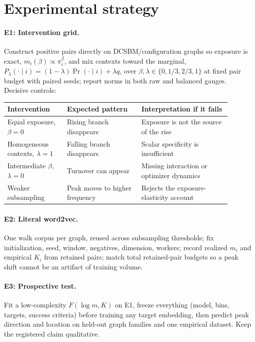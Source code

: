 \documentclass[11pt]{article}
\begin{document}
\section{Experimental strategy}

\paragraph{E1: Intervention grid.}
Construct positive pairs directly on DCSBM/configuration graphs so exposure is exact, \(m_i(\beta)\propto\pi_i^\beta\), and mix contexts toward the marginal, \(P_\lambda(\cdot\mid i)=(1-\lambda)\Pr(\cdot\mid i)+\lambda q\), over \(\beta,\lambda\in\{0,1/3,2/3,1\}\) at fixed pair budget with paired seeds; report norms in both raw and balanced gauges.
Decisive controls:

\begin{center}
\small
\begin{tabular}{p{0.24\linewidth}p{0.30\linewidth}p{0.36\linewidth}}
\toprule
Intervention & Expected pattern & Interpretation if it fails \\
\midrule
Equal exposure, \(\beta=0\) & Rising branch disappears & Exposure is not the source of the rise \\
Homogeneous contexts, \(\lambda=1\) & Falling branch disappears & Scalar specificity is insufficient \\
Intermediate \(\beta\), \(\lambda=0\) & Turnover can appear & Missing interaction or optimizer dynamics \\
Weaker subsampling & Peak moves to higher frequency & Rejects the exposure-elasticity account \\
\bottomrule
\end{tabular}
\end{center}

\paragraph{E2: Literal word2vec.}
One walk corpus per graph, reused across subsampling thresholds; fix initialization, seed, window, negatives, dimension, workers; record realized \(m_i\) and empirical \(K_i\) from retained pairs; match total retained-pair budgets so a peak shift cannot be an artifact of training volume.

\paragraph{E3: Prospective test.}
Fit a low-complexity \(F(\log m,K)\) on E1, freeze everything (model, bins, targets, success criteria) before training any target embedding, then predict peak direction and location on held-out graph families and one empirical dataset.
Keep the registered claim qualitative.



\end{document}
